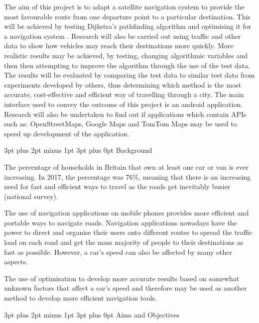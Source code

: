 \documentclass[12pt,a4paper]{article}
\makeatletter
\renewcommand\subsection{\@startsection {subsection}{1}{0mm} %
                               {3pt plus 2pt minus 1pt} %
                               {3pt plus 0pt} %
                               {\normalfont\bfseries}}
\makeatother
\begin{document}
The aim of this project is to adapt a satellite navigation system to provide the most favourable route from one departure point to a particular destination. This will be achieved by testing Dijkstra's pathfinding algorithm and optimising it for a navigation system \cite{Dijkstra1959}. Research will also be carried out using traffic and other data to show how vehicles may reach their destinations more quickly. More realistic results may be achieved, by testing, changing algorithmic variables and then then attempting to improve the algorithm through the use of the test data. The results will be evaluated by comparing the test data to similar test data from experiments developed by others, thus determining which method is the most accurate, cost-effective and efficient way of travelling through a city. The main interface used to convey the outcome of this project is an android application. Research will also be undertaken to find out if applications which contain APIs such as: OpenStreetMaps, Google Maps and TomTom Maps may be used to speed up development of the application.

\subsection{Background}

The percentage of households in Britain that own at least one car or van is ever increasing. In 2017, the percentage was 76\%, meaning that there is an increasing need for fast and efficient ways to travel as the roads get inevitably busier (national survey).

The use of navigation applications on mobile phones provides more efficient and portable ways to navigate roads. Navigation applications nowadays have the power to direct and organise their users onto different routes to spread the traffic load on each road and get the mass majority of people to their destinations as fast as possible. However, a car’s speed can also be affected by many other aspects.

The use of optimisation to develop more accurate results based on somewhat unknown factors that affect a car’s speed and therefore may be used as another method to develop more efficient navigation tools.


\subsection{Aims and Objectives}
\end{document}
